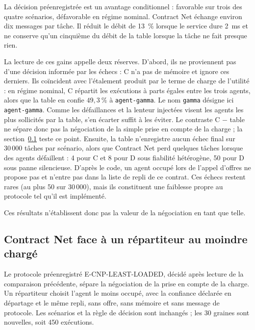 La décision préenregistrée est un avantage conditionnel : favorable sur trois des quatre scénarios, défavorable en régime nominal. Contract Net échange environ dix messages par tâche. Il réduit le débit de 13~\% lorsque le service dure 2~ms et ne conserve qu'un cinquième du débit de la table lorsque la tâche ne fait presque rien.

La lecture de ces gains appelle deux réserves. D'abord, ils ne proviennent pas d'une décision informée par les échecs : C n'a pas de mémoire et ignore ces derniers. Ils coïncident avec l'étalement produit par le terme de charge de l'utilité : en régime nominal, C répartit les exécutions à parts égales entre les trois agents, alors que la table en confie $49{,}3~\%$ à \texttt{agent-gamma}. Le nom \texttt{gamma} désigne ici \texttt{agent-gamma}. Comme les défaillances et la lenteur injectées visent les agents les plus sollicités par la table, s'en écarter suffit à les éviter. Le contraste C $-$ table ne sépare donc pas la négociation de la simple prise en compte de la charge ; la section~\ref{sec:e-cnp-moindre} teste ce point. Ensuite, la table n'enregistre aucun échec final sur $30\,000$ tâches par scénario, alors que Contract Net perd quelques tâches lorsque des agents défaillent : 4 pour C et 8 pour D sous fiabilité hétérogène, 50 pour D sous panne silencieuse. D'après le code, un agent occupé lors de l'appel d'offres ne propose pas et n'entre pas dans la liste de repli de ce contrat. Ces échecs restent rares (au plus 50 sur $30\,000$), mais ils constituent une faiblesse propre au protocole tel qu'il est implémenté.

Ces résultats n'établissent donc pas la valeur de la négociation en tant que telle.

\subsection{Contract Net face à un répartiteur au moindre chargé}
\label{sec:e-cnp-moindre}

Le protocole préenregistré E-CNP-LEAST-LOADED, décidé après lecture de la comparaison précédente, sépare la négociation de la prise en compte de la charge. Un répartiteur choisit l'agent le moins occupé, avec la confiance déclarée en départage et le même repli, sans offre, sans mémoire et sans message de protocole. Les scénarios et la règle de décision sont inchangés ; les 30 graines sont nouvelles, soit 450 exécutions.

